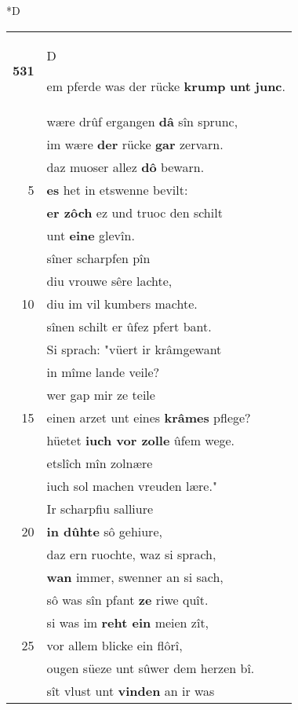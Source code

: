 \documentclass[8pt,a4paper,notitlepage]{article}
\begin{document}
\begin{table}[ht]
\begin{minipage}[t]{0.5\linewidth}
\small
\begin{center}*D
\end{center}
\begin{tabular}{rl}
\textbf{531} & \begin{large}D\end{large}em pferde was der rücke \textbf{krump} \textbf{unt} \textbf{junc}.\\ 
 & wære drûf ergangen \textbf{dâ} sîn sprunc,\\ 
 & im wære \textbf{der} rücke \textbf{gar} zervarn.\\ 
 & daz muoser allez \textbf{dô} bewarn.\\ 
5 & \textbf{es} het in etswenne bevilt:\\ 
 & \textbf{er zôch} ez und truoc den schilt\\ 
 & unt \textbf{eine} glevîn.\\ 
 & sîner scharpfen pîn\\ 
 & diu vrouwe sêre lachte,\\ 
10 & diu im vil kumbers machte.\\ 
 & sînen schilt er ûfez pfert bant.\\ 
 & Si sprach: "vüert ir krâmgewant\\ 
 & in mîme lande veile?\\ 
 & wer gap mir ze teile\\ 
15 & einen arzet unt eines \textbf{krâmes} pflege?\\ 
 & hüetet \textbf{iuch vor zolle} ûfem wege.\\ 
 & etslîch mîn zolnære\\ 
 & iuch sol machen vreuden lære."\\ 
 & Ir scharpfiu salliure\\ 
20 & \textbf{in dûhte} sô gehiure,\\ 
 & daz ern ruochte, waz si sprach,\\ 
 & \textbf{wan} immer, swenner an si sach,\\ 
 & sô was sîn pfant \textbf{ze} riwe quît.\\ 
 & si was im \textbf{reht ein} meien zît,\\ 
25 & vor allem blicke ein flôrî,\\ 
 & ougen süeze unt sûwer dem herzen bî.\\ 
 & sît vlust unt \textbf{vinden} an ir was\\ 

\end{tabular}
\end{minipage}
\end{table}
\end{document}
